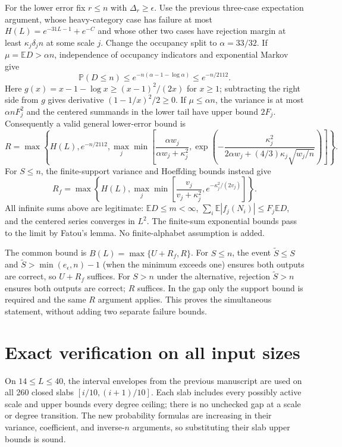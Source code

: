 \documentclass[10pt]{article}
\newcommand{\E}{\mathbb E}
\newcommand{\Prb}{\mathbb P}
\begin{document}
For the lower error fix $r\le n$ with $\Delta_r\ge\epsilon$.
Use the previous three-case expectation argument, whose heavy-category
case has failure at most $H(L)=e^{-31L-1}+e^{-C}$ and whose other two cases
have rejection margin at least $\kappa_j\delta_j n$ at some scale $j$.
Change the occupancy split to $\alpha=33/32$. If $\mu=\E D>\alpha n$,
independence of occupancy indicators and exponential Markov give
\[
 \Prb(D\le n)\le e^{-n(\alpha-1-\log\alpha)}
 \le e^{-n/2112}.
\]
Here $g(x)=x-1-\log x\ge(x-1)^2/(2x)$ for $x\ge1$; subtracting the
right side from $g$ gives derivative $(1-1/x)^2/2\ge0$.
If $\mu\le\alpha n$, the variance is at most $\alpha n F_j^2$ and
the centered summands in the lower tail have upper bound $2F_j$.
Consequently a valid general lower-error bound is
\[
 R=\max\left\{H(L),e^{-n/2112},
 \max_j\min\left[\frac{\alpha w_j}{\alpha w_j+\kappa_j^2},
 \exp\left(-\frac{\kappa_j^2}{2\alpha w_j+(4/3)\kappa_j\sqrt{w_j/n}}\right)
 \right]\right\}.
\]
For $S\le n$, the finite-support variance and Hoeffding bounds instead give
\[
 R_f=\max\left\{H(L),\max_j\min\left[
 \frac{v_j}{v_j+\kappa_j^2},e^{-\kappa_j^2/(2v_j)}\right]\right\}.
\]
All infinite sums above are legitimate: $\E D\le m<\infty$,
$\sum_i\E|f_j(N_i)|\le F_j\E D$, and the centered series converges in
$L^2$. The finite-sum exponential bounds pass to the limit by Fatou's
lemma. No finite-alphabet assumption is added.

The common bound is $B(L)=\max\{U+R_f,R\}$. For $S\le n$, the event
$\widetilde S\le S$ and $\widetilde S>\min(e_\epsilon,n)-1$ (when the
minimum exceeds one) ensures both outputs are correct, so $U+R_f$ suffices.
For $S>n$ under the alternative, rejection $\widetilde S>n$ ensures both
outputs are correct; $R$ suffices. In the gap only the support bound is
required and the same $R$ argument applies. This proves the simultaneous
statement, without adding two separate failure bounds.

\section{Exact verification on all input sizes}
On $14\le L\le40$, the interval envelopes from the previous manuscript are
used on all 260 closed slabs $[i/10,(i+1)/10]$. Each slab includes every
possibly active scale and upper bounds every degree ceiling; there is no
unchecked gap at a scale or degree transition. The new probability formulas
are increasing in their variance, coefficient, and inverse-$n$ arguments,
so substituting their slab upper bounds is sound.
\end{document}
